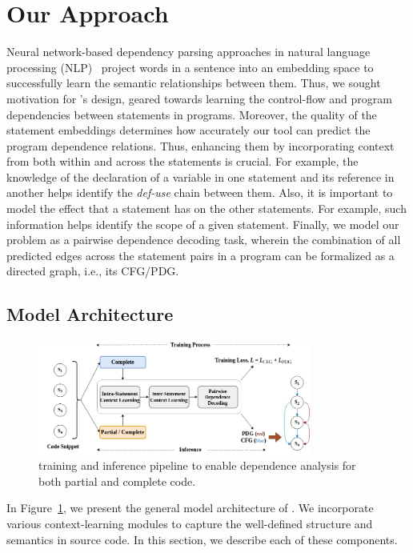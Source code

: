 \section{Our Approach}
\label{sec:approach}

Neural network-based dependency parsing approaches in natural language processing (NLP)~\cite{chen-manning-2014-fast} project words in a sentence into an embedding space to successfully learn the semantic relationships between them. Thus, we sought motivation for \tool's design, geared towards learning the control-flow and program dependencies between statements in programs. Moreover, the quality of the statement embeddings determines how accurately our tool can predict the program dependence relations. Thus, enhancing them by incorporating context from both within and across the statements is crucial. For example, the knowledge of the declaration of a variable in one statement and its reference in another helps identify the \textit{def-use} chain between them. Also, it is important to model the effect that a statement has on the other statements. For example, such information helps identify the scope of a given statement. Finally, we model our problem as a pairwise dependence decoding task, wherein the combination of all predicted edges across the statement pairs in a program can be formalized as a directed graph, i.e., its CFG/PDG.

\subsection{Model Architecture}
\label{sec:arch}

\begin{figure}[hbt!]
\begin{center}
    \includegraphics[width=0.8\textwidth]{icse23-demo-figures/demo-arch.png}
    \caption{\tool training and inference pipeline to enable dependence analysis for both partial and complete code.}
    \label{fig:model}
    \vspace{-10pt}
\end{center}
\end{figure}
In Figure~\ref{fig:model}, we present the general model architecture of \tool. We incorporate various context-learning modules to capture the well-defined structure and semantics in source code. In this section, we describe each of these components.

